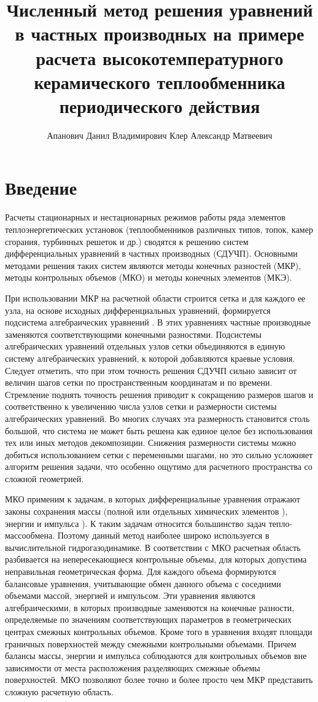 \documentclass[a4paper,12pt]{article}
\title{
  Численный метод решения
  уравнений в частных производных на примере расчета
  высокотемпературного керамического теплообменника периодического
  действия
}
\author{
Апанович Данил Владимирович
Клер Александр Матвеевич
  }
\begin{document}
  \maketitle
  \section*{Введение}

  Расчеты стационарных и нестационарных режимов работы ряда элементов
  теплоэнергетических установок (теплообменников различных типов,
  топок, камер сгорания, турбинных решеток и др.) сводятся к решению
  систем дифференциальных уравнений в частных производных
  (СДУЧП). Основными методами решения таких систем являются методы
  конечных разностей (МКР), методы контрольных объемов (МКО) и методы
  конечных элементов (МКЭ).
  
  При использовании МКР на расчетной области строится сетка и для
  каждого ее узла, на основе исходных дифференциальных уравнений,
  формируется подсистема алгебраических уравнений
  \cite{1978,Smith1985}. В этих уравнениях частные производные
  заменяются соответствующими конечными разностями. Подсистемы
  алгебраических уравнений отдельных узлов сетки объединяются в единую
  систему алгебраических уравнений, к которой добавляются краевые
  условия. Следует отметить, что при этом точность решения СДУЧП
  сильно зависит от величин шагов сетки по пространственным
  координатам и по времени. Стремление поднять точность решения
  приводит к сокращению размеров шагов и соответственно к увеличению
  числа узлов сетки и размерности системы алгебраических уравнений. Во
  многих случаях эта размерность становится столь большой, что система
  не может быть решена как единое целое без использования тех или иных
  методов декомпозиции. Снижения размерности системы можно добиться
  использованием сетки с переменными шагами, но это сильно усложняет
  алгоритм решения задачи, что особенно ощутимо для расчетного
  пространства со сложной геометрией.
  
  МКО применим к задачам, в которых дифференциальные уравнения
  отражают законы сохранения массы (полной или отдельных химических
  элементов ), энергии и импульса
  \cite{patankar1968heat,Eymard2003}). К таким задачам относится
  большинство задач тепло-массообмена. Поэтому данный метод наиболее
  широко используется в вычислительной гидрогазодинамике. В
  соответствии с МКО расчетная область разбивается на непересекающиеся
  контрольные объемы, для которых допустима неправильная
  геометрическая форма. Для каждого объема формируются балансовые
  уравнения, учитывающие обмен данного объема с соседними объемами
  массой, энергией и импульсом. Эти уравнения являются
  алгебраическими, в которых производные заменяются на конечные
  разности, определяемые по значениям соответствующих параметров в
  геометрических центрах смежных контрольных объемов. Кроме того в
  уравнения входят площади граничных поверхностей между смежными
  контрольными объемами. Причем балансы массы, энергии и импульса
  соблюдаются для контрольных объемов вне зависимости от места
  расположения разделяющих смежные объемы поверхностей. МКО позволяют
  более точно и более просто чем МКР представить сложную расчетную
  область.
  
\end{document}
